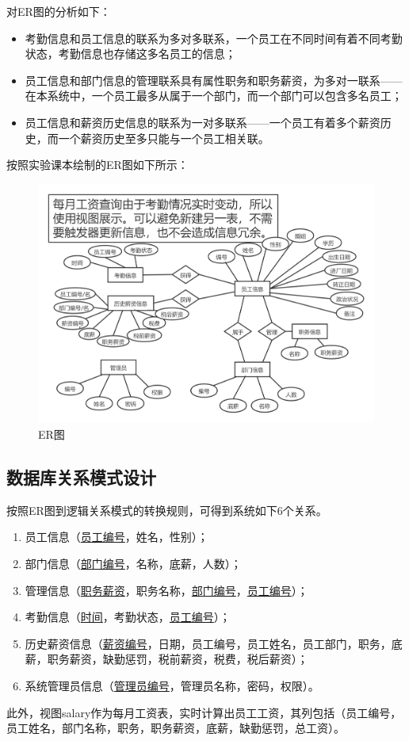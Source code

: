 \documentclass[withoutpreface,bwprint]{cumcmthesis} %
\begin{document}
对ER图的分析如下：
	\begin{itemize}
	\item 考勤信息和员工信息的联系为多对多联系，一个员工在不同时间有着不同考勤状态，考勤信息也存储这多名员工的信息；
	\item 员工信息和部门信息的管理联系具有属性职务和职务薪资，为多对一联系——在本系统中，一个员工最多从属于一个部门，而一个部门可以包含多名员工；
	\item 员工信息和薪资历史信息的联系为一对多联系——一个员工有着多个薪资历史，而一个薪资历史至多只能与一个员工相关联。
	\end{itemize}
	
	按照实验课本绘制的ER图如下所示：
\begin{figure}[H]
    \centering
    \includegraphics[width=1\linewidth]{ERGraph}
    \caption{ER图}
    \label{ER}
\end{figure}
\subsection{数据库关系模式设计}
按照ER图到逻辑关系模式的转换规则，可得到系统如下6个关系。
\begin{enumerate}
	\item 员工信息（\uline{员工编号}，姓名，性别）；
	\item 部门信息（\uline{部门编号}，名称，底薪，人数）；
	\item 管理信息（\uline{职务薪资}，职务名称，\uline{部门编号}，\uline{员工编号}）；
	\item 考勤信息（\uline{时间}，考勤状态，\uline{员工编号}）；
	\item 历史薪资信息（\uline{薪资编号}，日期，员工编号，员工姓名，员工部门，职务，底薪，职务薪资，缺勤惩罚，税前薪资，税费，税后薪资）；
	\item 系统管理员信息（\uline{管理员编号}，管理员名称，密码，权限）。
\end{enumerate}
此外，视图salary作为每月工资表，实时计算出员工工资，其列包括（员工编号，员工姓名，部门名称，职务，职务薪资，底薪，缺勤惩罚，总工资）。
\end{document}
